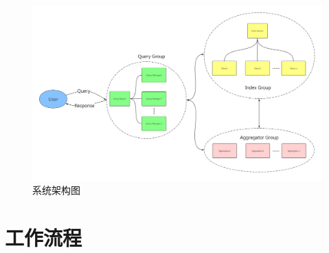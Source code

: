 \documentclass{elegantpaper}
\begin{document}
\begin{figure}[htbp]
    \centering
    \includegraphics[width=1\textwidth]{figure/architecture.png}
    \caption{系统架构图}
\end{figure}

\section{工作流程}
\end{document}
